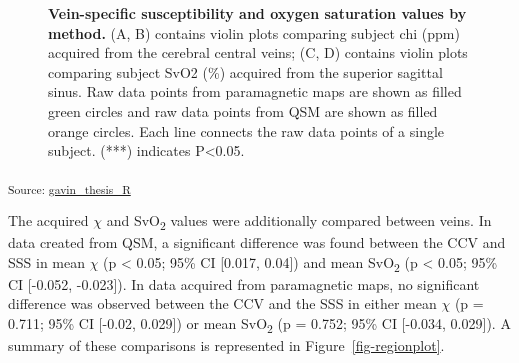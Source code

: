 \documentclass[
true
]{sn-jnl}
\begin{document}
\begin{figure}[H]


\caption{\label{fig-methodplot}\textbf{Vein-specific susceptibility and
oxygen saturation values by method.} (A, B) contains violin plots
comparing subject chi (ppm) acquired from the cerebral central veins;
(C, D) contains violin plots comparing subject SvO2 (\%) acquired from
the superior sagittal sinus. Raw data points from paramagnetic maps are
shown as filled green circles and raw data points from QSM are shown as
filled orange circles. Each line connects the raw data points of a
single subject. (***) indicates P\textless0.05.}

\end{figure}%

\textsubscript{Source:
\href{https://WeberLab.github.io/Chisep_CSVO2_Manuscript/notebooks/gavin_thesis_markdown.qmd.html\#cell-fig-methodplot}{gavin\_thesis\_R}}

The acquired \(\chi\) and SvO\textsubscript{2} values were additionally
compared between veins. In data created from QSM, a significant
difference was found between the CCV and SSS in mean \(\chi\) (p
\textless{} 0.05; 95\% CI {[}0.017, 0.04{]}) and mean
SvO\textsubscript{2} (p \textless{} 0.05; 95\% CI {[}-0.052, -0.023{]}).
In data acquired from paramagnetic maps, no significant difference was
observed between the CCV and the SSS in either mean \(\chi\) (p = 0.711;
95\% CI {[}-0.02, 0.029{]}) or mean SvO\textsubscript{2} (p = 0.752;
95\% CI {[}-0.034, 0.029{]}). A summary of these comparisons is
represented in Figure~\ref{fig-regionplot}.
\end{document}

